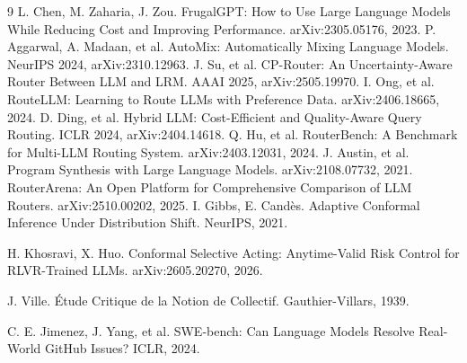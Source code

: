\documentclass[11pt]{article}
\newcounter{todocount}
\begin{document}
\begin{thebibliography}{9}
 L. Chen, M. Zaharia, J. Zou. FrugalGPT: How to Use Large Language Models While
Reducing Cost and Improving Performance. arXiv:2305.05176, 2023.
 P. Aggarwal, A. Madaan, et al. AutoMix: Automatically Mixing Language Models.
NeurIPS 2024, arXiv:2310.12963.
 J. Su, et al. CP-Router: An Uncertainty-Aware Router Between LLM and LRM.
AAAI 2025, arXiv:2505.19970.
 I. Ong, et al. RouteLLM: Learning to Route LLMs with Preference Data.
arXiv:2406.18665, 2024.
 D. Ding, et al. Hybrid LLM: Cost-Efficient and Quality-Aware Query Routing.
ICLR 2024, arXiv:2404.14618.
 Q. Hu, et al. RouterBench: A Benchmark for Multi-LLM Routing System.
arXiv:2403.12031, 2024.
 J. Austin, et al. Program Synthesis with Large Language Models. arXiv:2108.07732,
2021.
 RouterArena: An Open Platform for Comprehensive Comparison of LLM Routers.
arXiv:2510.00202, 2025.
 I. Gibbs, E. Cand\`es. Adaptive Conformal Inference Under Distribution
Shift. NeurIPS, 2021.

 H. Khosravi, X. Huo. Conformal Selective Acting: Anytime-Valid Risk Control
for RLVR-Trained LLMs. arXiv:2605.20270, 2026.

 J. Ville. \'Etude Critique de la Notion de Collectif. Gauthier-Villars, 1939.

 C. E. Jimenez, J. Yang, et al. SWE-bench: Can Language Models Resolve Real-World
GitHub Issues? ICLR, 2024.

\end{thebibliography}

\end{document}
